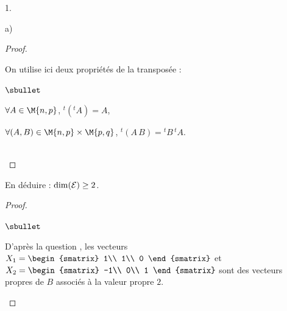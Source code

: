 \begin{noliste}{1.}
\begin{noliste}{a)}
\begin{proof}
      \begin{remark}
        On utilise ici deux propriétés de la transposée :
        \begin{noliste}{$\sbullet$}
	  \item $\forall A \in \M{n,p}$, ${}^t ({}^t A) = A$,
	  \item $\forall (A,B) \in \M{n,p} \times \M{p,q}$, 
	  ${}^t(A \, B) = {}^t B \, {}^t A$.
        \end{noliste}
      \end{remark}~\\[-1.4cm]
    \end{proof}
    
    
    \newpage

    
  \item En déduire : $\dim({\cal E}) \geq 2$.
    
    \begin{proof}~
      \begin{noliste}{$\sbullet$}
	\item D'après la question , les vecteurs $X_1=
	\begin{smatrix}
	  1\\
	  1\\
	  0
	\end{smatrix}$ et $X_2 =
	\begin{smatrix}
	  -1\\
	  0\\
	  1
	\end{smatrix}$ sont des vecteurs propres de $B$ associés à la 
	valeur propre $2$.
	

\end{noliste}
\end{proof}
\end{noliste}
\end{noliste}
